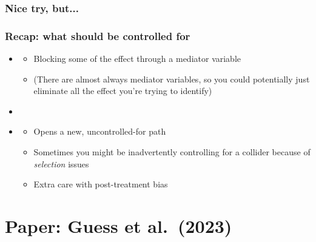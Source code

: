 \begin{frame}
\frametitle{Nice try, but...}
\centering


\end{frame}
\note{}

\begin{frame}
\frametitle{Recap: what should  be controlled for}
\centering

\begin{itemize}
  \item[1.] 
  \begin{itemize}
    \item Blocking some of the effect through a mediator variable
    \item (There are almost always mediator variables, so you could potentially just eliminate all the effect you're trying to identify)
  \end{itemize}
  \item[]
  \item[2.] 
  \begin{itemize}
    \item Opens a new, uncontrolled-for path
    \item Sometimes you might be inadvertently controlling for a collider because of \textit{selection} issues
    \item Extra care with post-treatment bias
  \end{itemize}
\end{itemize}

\end{frame}
\note{}

\section{Paper: Guess et al.\ (2023)}

